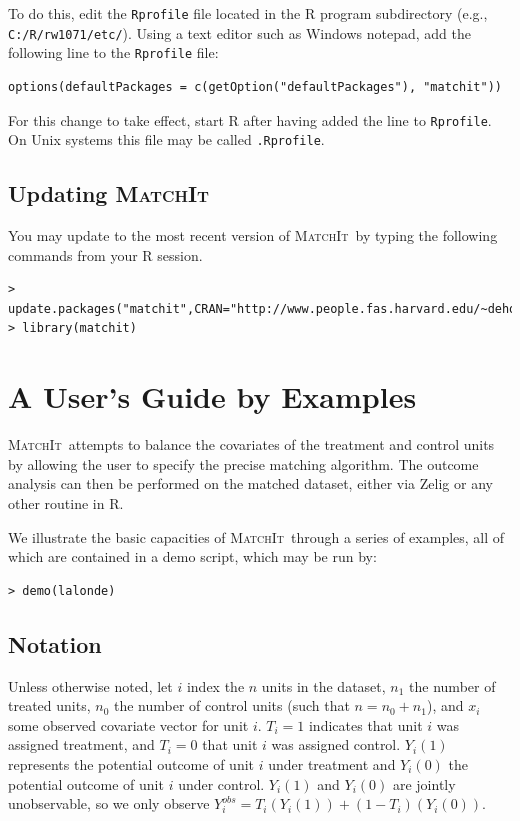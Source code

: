 \documentclass[oneside,letterpaper,titlepage]{article}
\newcommand{\MatchIt}{\textsc{MatchIt}}
\begin{document}
To do this, edit the {\tt Rprofile} file
located in the R program subdirectory (e.g.,
\texttt{C:/R/rw1071/etc/}).  Using a text editor such as
  Windows notepad, add the following line to the {\tt Rprofile} file:

\begin{verbatim}
options(defaultPackages = c(getOption("defaultPackages"), "matchit"))
\end{verbatim}

For this change to take effect, start R after having added the line to
{\tt Rprofile}.  On Unix systems this file may be called 
{\tt .Rprofile}.  

\subsection{Updating \MatchIt}
You may update to the most recent version of \MatchIt\ by typing the following
commands from your R session. 

\begin{small}
\begin{verbatim}
> update.packages("matchit",CRAN="http://www.people.fas.harvard.edu/~deho")
> library(matchit) 
\end{verbatim}
\end{small} 

\section{A User's Guide by Examples}
\MatchIt\ attempts to balance the covariates of the treatment and control units by allowing
the user to specify the precise matching algorithm.  The outcome analysis can
then be performed on the matched dataset, either via Zelig or any
other routine in R.  

We illustrate the basic capacities of \MatchIt\ through a series of
examples, all of which are contained in a demo script, which may be
run by: 

\begin{verbatim}
> demo(lalonde)
\end{verbatim}

\subsection{Notation}
Unless otherwise noted, let $i$ index the $n$ units in the dataset,
$n_1$ the number of treated units, $n_0$ the number of control units
(such that $n=n_0+n_1$), and $x_i$ some observed covariate vector for unit
$i$.  $T_i=1$ indicates that unit $i$ was assigned treatment, and
$T_i=0$ that unit $i$ was assigned control.  $Y_i(1)$ represents the
potential outcome of unit $i$ under treatment and $Y_i(0)$ the
potential outcome of unit $i$ under control.  $Y_i(1)$ and $Y_i(0)$
are jointly unobservable, so we only observe
$Y_i^{obs}=T_i(Y_i(1))+(1-T_i)(Y_i(0))$.
\end{document}
